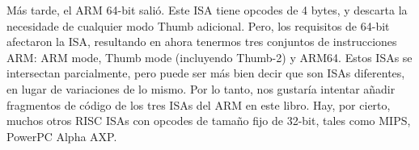 Más tarde, el ARM 64-bit salió. Este \ac{ISA} tiene opcodes de 4 bytes, y descarta la necesidade de cualquier modo Thumb adicional.
Pero, los requisitos de 64-bit afectaron la \ac{ISA}, resultando en ahora tenermos tres conjuntos de instrucciones ARM: ARM mode, Thumb mode (incluyendo Thumb-2) y ARM64.
Estos \ac{ISA}s se intersectan parcialmente, pero puede ser más bien decir que son \ac{ISA}s diferentes, en lugar de variaciones de lo mismo.
Por lo tanto, nos gustaría intentar añadir fragmentos de código de los tres \ac{ISA}s del ARM en este libro.
%
%
%
Hay, por cierto, muchos otros \ac{RISC} \ac{ISA}s con opcodes de tamaño fijo de 32-bit, tales como MIPS, PowerPC \ESph{} Alpha AXP.
\fi %
\fi %









\ifx\LITE\undefined

\fi






\ifx\LITE\undefined

\fi




\ifx\LITE\undefined


\fi

\ifx\LITE\undefined

\fi

\ifx\LITE\undefined

\fi
\ifdefined\IncludeARM

\fi
\ifdefined\IncludeMIPS

\fi
